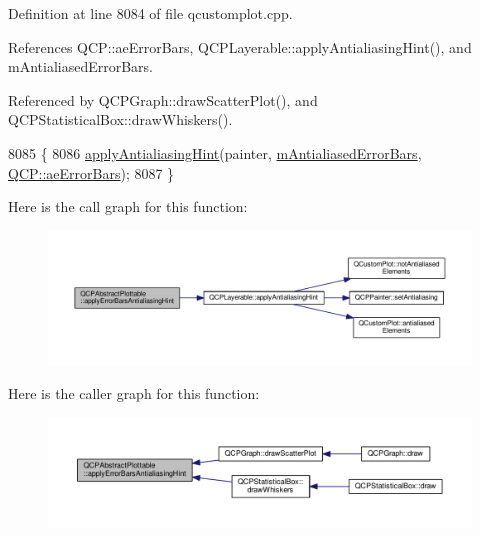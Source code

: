 Definition at line 8084 of file qcustomplot.\+cpp.



References Q\+C\+P\+::ae\+Error\+Bars, Q\+C\+P\+Layerable\+::apply\+Antialiasing\+Hint(), and m\+Antialiased\+Error\+Bars.



Referenced by Q\+C\+P\+Graph\+::draw\+Scatter\+Plot(), and Q\+C\+P\+Statistical\+Box\+::draw\+Whiskers().


\begin{DoxyCode}
8085                                \{
8086   \hyperlink{class_q_c_p_layerable_a62bd552d1a45aa9accb24b310542279e}{applyAntialiasingHint}(painter, \hyperlink{class_q_c_p_abstract_plottable_ad48660b2bd301576e92fb033d8f455ea}{mAntialiasedErrorBars}, 
      \hyperlink{namespace_q_c_p_ae55dbe315d41fe80f29ba88100843a0ca9dcf3882cb321bb305f71fdc0f09f63d}{QCP::aeErrorBars});
8087 \}
\end{DoxyCode}


Here is the call graph for this function\+:\nopagebreak
\begin{figure}[H]
\begin{center}
\leavevmode
\includegraphics[width=350pt]{class_q_c_p_abstract_plottable_af687bfe6160255960558eb71f1f81e73_cgraph}
\end{center}
\end{figure}




Here is the caller graph for this function\+:\nopagebreak
\begin{figure}[H]
\begin{center}
\leavevmode
\includegraphics[width=350pt]{class_q_c_p_abstract_plottable_af687bfe6160255960558eb71f1f81e73_icgraph}
\end{center}
\end{figure}


